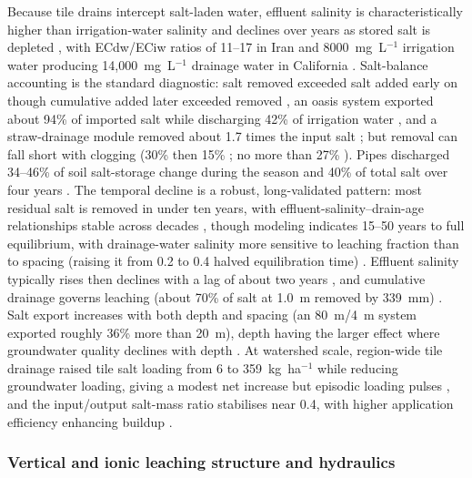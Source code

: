 Because tile drains intercept salt-laden water, effluent salinity is
characteristically higher than irrigation-water salinity and declines over years
as stored salt is depleted \parencite{Li2022,Karegoudar2022}, with ECdw/ECiw
ratios of 11--17 in Iran \parencite{Akram2013} and 8000~mg~L$^{-1}$ irrigation
water producing 14{,}000~mg~L$^{-1}$ drainage water in California
\parencite{KARAJEH1994c}. Salt-balance accounting is the standard diagnostic:
salt removed exceeded salt added early on though cumulative added later exceeded
removed \parencite{Manjunatha2004}, an oasis system exported about 94\% of
imported salt while discharging 42\% of irrigation water \parencite{Askri2022},
and a straw-drainage module removed about 1.7 times the input salt
\parencite{Lu2019}; but removal can fall short with clogging (30\% then 15\%
\parencite{BenAissa2013}; no more than 27\% \parencite{HajAmor2019}). Pipes
discharged 34--46\% of soil salt-storage change during the season
\parencite{Liu2025c} and 40\% of total salt over four years \parencite{Heng2021}.
The temporal decline is a robust, long-validated pattern: most residual salt is
removed in under ten years, with effluent-salinity--drain-age relationships stable
across decades \parencite{JOHNSTON1993}, though modeling indicates 15--50 years
to full equilibrium, with drainage-water salinity more sensitive to leaching
fraction than to spacing (raising it from 0.2 to 0.4 halved equilibration time)
\parencite{Kelleners2000}. Effluent salinity typically rises then declines with a
lag of about two years \parencite{Manjunatha2004,Sharma2006,Jayawardane2001}, and
cumulative drainage governs leaching (about 70\% of salt at 1.0~m removed by
339~mm) \parencite{Bahçeci2009}. Salt export increases with both depth and
spacing (an 80~m/4~m system exported roughly 36\% more than 20~m), depth having
the larger effect where groundwater quality declines with depth
\parencite{GRISMER1993,KAMRA1991,KAMRA1994}. At watershed scale, region-wide tile
drainage raised tile salt loading from 6 to 359~kg~ha$^{-1}$ while reducing
groundwater loading, giving a modest net increase but episodic loading pulses
\parencite{Addab2022}, and the input/output salt-mass ratio stabilises near 0.4,
with higher application efficiency enhancing buildup \parencite{KARAJEH1994c}.

\subsubsection{Vertical and ionic leaching structure and hydraulics}

